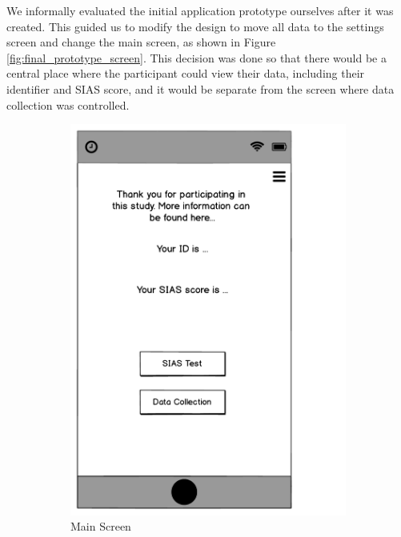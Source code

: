 \documentclass{l4proj}
\begin{document}
We informally evaluated the initial application prototype ourselves after it was created. This guided us to modify the design to move all data to the settings screen and change the main screen, as shown in Figure \ref{fig:final_prototype_screen}. This decision was done so that there would be a central place where the participant could view their data, including their identifier and SIAS score, and it would be separate from the screen where data collection was controlled.

\begin{figure}[htbp]
    \centering
    \begin{subfigure}[b]{0.45\textwidth}
        \includegraphics[width=\textwidth]{images/iteration_1_main_screen_1.pdf}
        \caption{Main Screen}
        \label{fig:main_screen_1}
    \end{subfigure}
    \begin{subfigure}[b]{0.45\textwidth}

\end{subfigure}
\end{figure}
\end{document}
